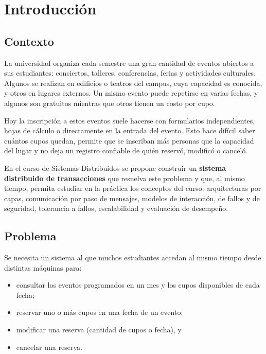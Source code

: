 \section{Introducción}

\subsection{Contexto}

La universidad organiza cada semestre una gran cantidad de eventos abiertos a sus
estudiantes: conciertos, talleres, conferencias, ferias y actividades culturales.
Algunos se realizan en edificios o teatros del campus, cuya capacidad es conocida,
y otros en lugares externos. Un mismo evento puede repetirse en varias fechas, y
algunos son gratuitos mientras que otros tienen un costo por cupo.

Hoy la inscripción a estos eventos suele hacerse con formularios independientes,
hojas de cálculo o directamente en la entrada del evento. Esto hace difícil saber
cuántos cupos quedan, permite que se inscriban más personas que la capacidad del
lugar y no deja un registro confiable de quién reservó, modificó o canceló.

En el curso de Sistemas Distribuidos se propone construir un \textbf{sistema
distribuido de transacciones} que resuelva este problema y que, al mismo tiempo,
permita estudiar en la práctica los conceptos del curso: arquitecturas por capas,
comunicación por paso de mensajes, modelos de interacción, de fallos y de
seguridad, tolerancia a fallos, escalabilidad y evaluación de desempeño.

\subsection{Problema}

Se necesita un sistema al que muchos estudiantes accedan al mismo tiempo desde
distintas máquinas para:

\begin{itemize}
    \item consultar los eventos programados en un mes y los cupos disponibles de cada fecha;
    \item reservar uno o más cupos en una fecha de un evento;
    \item modificar una reserva (cantidad de cupos o fecha), y
    \item cancelar una reserva.
\end{itemize}

